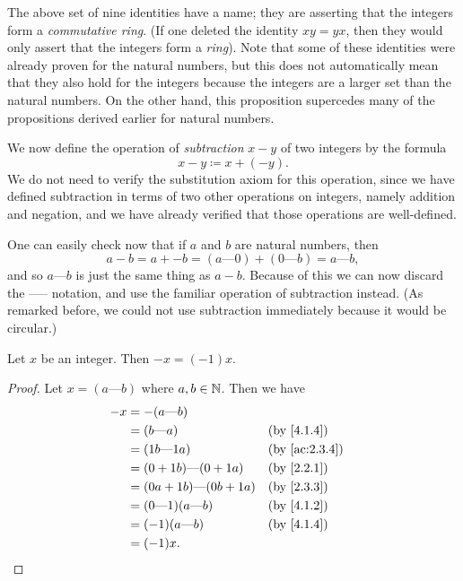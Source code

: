 \begin{rmk}\label{4.1.7}
  The above set of nine identities have a name; they are asserting that the integers form a \emph{commutative ring}.
  (If one deleted the identity \(xy = yx\), then they would only assert that the integers form a \emph{ring}).
  Note that some of these identities were already proven for the natural numbers, but this does not automatically mean that they also hold for the integers because the integers are a larger set than the natural numbers.
  On the other hand, this proposition supercedes many of the propositions derived earlier for natural numbers.
\end{rmk}

\begin{note}
  We now define the operation of \emph{subtraction} \(x - y\) of two integers by the formula
  \[
    x - y \coloneqq x + (-y).
  \]
  We do not need to verify the substitution axiom for this operation, since we have defined subtraction in terms of two other operations on integers, namely addition and negation, and we have already verified that those operations are well-defined.
\end{note}

\begin{note}
  One can easily check now that if \(a\) and \(b\) are natural numbers, then
  \[
    a - b = a + -b = (a \text{---} 0) + (0 \text{---} b) = a \text{---} b,
  \]
  and so \(a \text{---} b\) is just the same thing as \(a - b\).
  Because of this we can now discard the ----- notation, and use the familiar operation of subtraction instead.
  (As remarked before, we could not use subtraction immediately because it would be circular.)
\end{note}

\begin{ac}\label{ac:4.1.3}
  Let \(x\) be an integer.
  Then \(-x = (-1)x\).
\end{ac}

\begin{proof}
  Let \(x = (a \text{---} b)\) where \(a, b \in \mathbb{N}\).
  Then we have
  \begin{align*}
    -x & = -(a \text{---} b)                                   \\
       & = (b \text{---} a)                 &  & \by{4.1.4}    \\
       & = (1b \text{---} 1a)               &  & \by{ac:2.3.4} \\
       & = (0 + 1b) \text{---} (0 + 1a)     &  & \by{2.2.1}    \\
       & = (0a + 1b) \text{---} (0b + 1a)   &  & \by{2.3.3}    \\
       & = (0 \text{---} 1)(a \text{---} b) &  & \by{4.1.2}    \\
       & = (-1)(a \text{---} b)             &  & \by{4.1.4}    \\
       & = (-1)x.
  \end{align*}
\end{proof}

